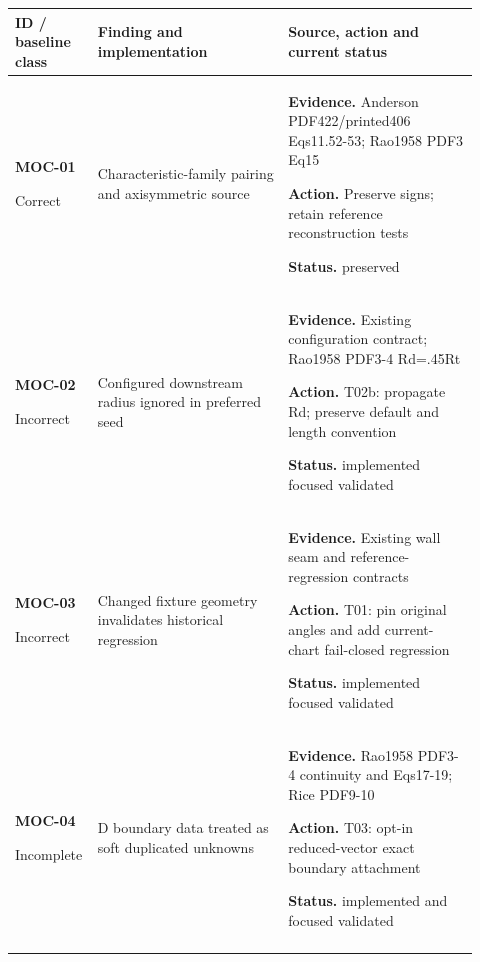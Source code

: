 \begingroup\footnotesize
\begin{longtable}{@{}P{0.12\linewidth}P{0.40\linewidth}P{0.40\linewidth}@{}}
\toprule\textbf{ID / baseline class} & \textbf{Finding and implementation} & \textbf{Source, action and current status}\\\midrule
\endhead
\textbf{MOC-01}\par Correct & Characteristic-family pairing and axisymmetric source\par {}\par {} & \textbf{Evidence.} Anderson PDF422/printed406 Eqs11.52-53; Rao1958 PDF3 Eq15\par \textbf{Action.} Preserve signs; retain reference reconstruction tests\par \textbf{Status.} preserved\\ \addlinespace[5pt]
\textbf{MOC-02}\par Incorrect & Configured downstream radius ignored in preferred seed\par {}\par {} & \textbf{Evidence.} Existing configuration contract; Rao1958 PDF3-4 Rd=.45Rt\par \textbf{Action.} T02b: propagate Rd; preserve default and length convention\par \textbf{Status.} implemented focused validated\\ \addlinespace[5pt]
\textbf{MOC-03}\par Incorrect & Changed fixture geometry invalidates historical regression\par {} & \textbf{Evidence.} Existing wall seam and reference-regression contracts\par \textbf{Action.} T01: pin original angles and add current-chart fail-closed regression\par \textbf{Status.} implemented focused validated\\ \addlinespace[5pt]
\textbf{MOC-04}\par Incomplete & D boundary data treated as soft duplicated unknowns\par {} & \textbf{Evidence.} Rao1958 PDF3-4 continuity and Eqs17-19; Rice PDF9-10\par \textbf{Action.} T03: opt-in reduced-vector exact boundary attachment\par \textbf{Status.} implemented and focused validated\\ \addlinespace[5pt]

\end{longtable}
